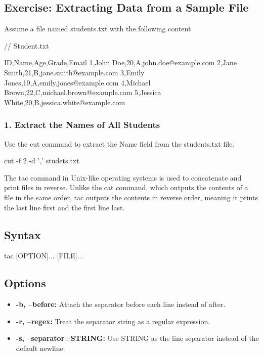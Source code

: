 \documentclass{report}
\begin{document}
    \bigbreak \noindent 
    \subsection{Exercise: Extracting Data from a Sample File}
    \bigbreak \noindent 
    Assume a file named students.txt with the following content
    \bigbreak \noindent 
    \begin{bashcode}
    // Student.txt

    ID,Name,Age,Grade,Email
    1,John Doe,20,A,john.doe@example.com
    2,Jane Smith,21,B,jane.smith@example.com
    3,Emily Jones,19,A,emily.jones@example.com
    4,Michael Brown,22,C,michael.brown@example.com
    5,Jessica White,20,B,jessica.white@example.com
    \end{bashcode}

    \bigbreak \noindent 
    \subsubsection{1. Extract the Names of All Students}
    \bigbreak \noindent 
    Use the cut command to extract the Name field from the students.txt file.
    \bigbreak \noindent 
    \begin{bashcode}
    cut -f 2 -d ',' studets.txt
    \end{bashcode}

    \pagebreak 
    \bigbreak \noindent 
    The tac command in Unix-like operating systems is used to concatenate and print files in reverse. Unlike the cat command, which outputs the contents of a file in the same order, tac outputs the contents in reverse order, meaning it prints the last line first and the first line last.
    \bigbreak \noindent 
    \subsection{Syntax}
    \bigbreak \noindent 
    \begin{bashcode}
    tac [OPTION]... [FILE]...
    \end{bashcode}
    \bigbreak \noindent 
    \subsection{Options}
    \begin{itemize}
        \item \textbf{-b, --before:} Attach the separator before each line instead of after.
        \item \textbf{-r, --regex:} Treat the separator string as a regular expression.
        \item \textbf{-s, --separator=STRING:} Use STRING as the line separator instead of the default newline.
    \end{itemize}
\end{document}
